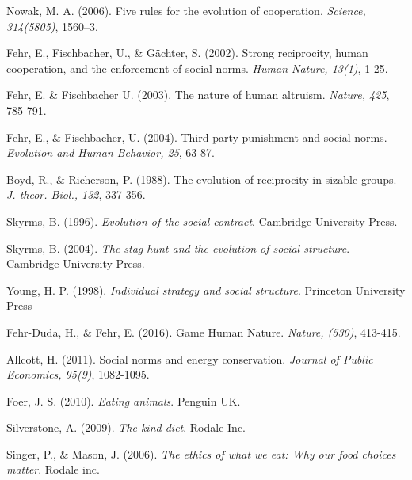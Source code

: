 \documentclass[rutwik_proposal.tex]{subfiles}
\begin{document}
\begin{thebibliography}{100}
Nowak, M. A. 
(2006). 
Five rules for the evolution of cooperation. 
\emph{Science, 314(5805)}, 
1560–3.

Fehr, E., Fischbacher, U., \& G\"achter, S.
(2002).
Strong reciprocity, human cooperation, and the enforcement of social norms.
\emph{Human Nature, 13(1)},
1-25.

Fehr, E. \& Fischbacher U.
(2003).
The nature of human altruism.
\emph{Nature, 425},
785-791.

Fehr, E., \& Fischbacher, U.
(2004).
Third-party punishment and social norms.
\emph{Evolution and Human Behavior, 25},
63-87.

Boyd, R., \& Richerson, P.
(1988).
The evolution of reciprocity in sizable groups.
\emph{J. theor. Biol., 132},
337-356.

Skyrms, B.
(1996).
\emph{Evolution of the social contract}.
Cambridge University Press.

Skyrms, B.
(2004).
\emph{The stag hunt and the evolution of social structure}.
Cambridge University Press.

Young, H. P.
(1998).
\emph{Individual strategy and social structure}.
Princeton University Press

Fehr-Duda, H., \& Fehr, E. 
(2016). 
Game Human Nature.
\emph{Nature, (530)},
413-415.

Allcott, H. 
(2011). 
Social norms and energy conservation. 
\emph{Journal of Public Economics, 95(9)}, 
1082-1095.

Foer, J. S. 
(2010). 
\emph{Eating animals}. 
Penguin UK.

Silverstone, A.
(2009).
\emph{The kind diet}.
Rodale Inc.

Singer, P., \& Mason, J.
(2006).
\emph{The ethics of what we eat: Why our food choices matter}.
Rodale inc.

\end{thebibliography}
\end{document}
